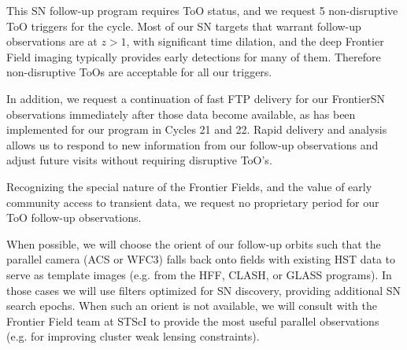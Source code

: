 \documentclass[12pt]{article}
\begin{document}




%
%
\specialreq             %


This SN follow-up program requires ToO status, and we request 5
non-disruptive ToO triggers for the cycle.  Most of our SN targets
that warrant follow-up observations are at $z>1$, with significant
time dilation, and the deep Frontier Field imaging typically provides
early detections for many of them.  Therefore non-disruptive ToOs are
acceptable for all our triggers.

In addition, we request a continuation of fast FTP delivery for our
FrontierSN observations immediately after those data become available,
as has been implemented for our program in Cycles 21 and 22.  Rapid
delivery and analysis allows us to respond to new information from our
follow-up observations and adjust future visits without requiring
disruptive ToO's.

Recognizing the special nature of the Frontier Fields, and the value
of early community access to transient data, we request no proprietary
period for our ToO follow-up observations.



%
%
\coordinatedobs          %


When possible, we will choose the orient of our follow-up orbits such
that the parallel camera (ACS or WFC3) falls back onto fields with
existing HST data to serve as template images (e.g. from the HFF,
CLASH, or GLASS programs).  In those cases we will use filters
optimized for SN discovery, providing additional SN search epochs.
When such an orient is not available, we will consult with the
Frontier Field team at STScI to provide the most useful parallel
observations (e.g. for improving cluster weak lensing constraints).
\end{document}

